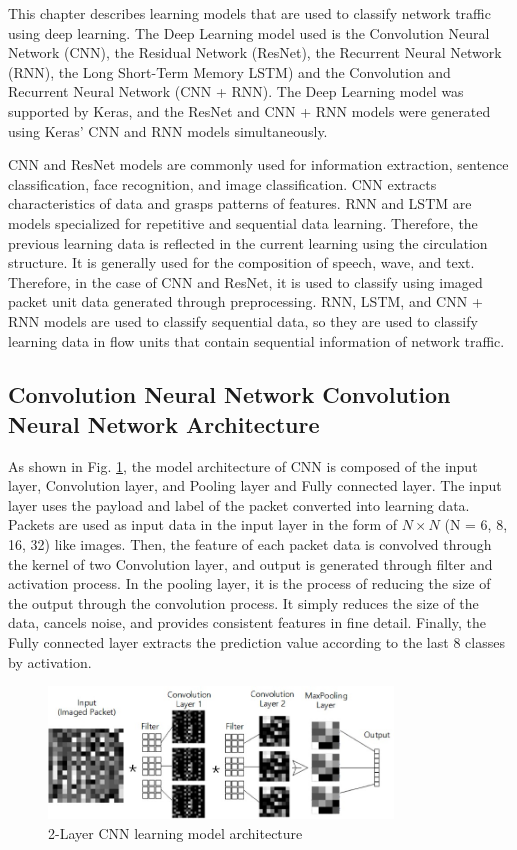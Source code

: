 This chapter describes learning models that are used to classify network traffic using deep learning.
The Deep Learning model used is the Convolution Neural Network (CNN), the Residual Network (ResNet), the Recurrent Neural Network (RNN), the Long Short-Term Memory LSTM) and the Convolution and Recurrent Neural Network (CNN + RNN).
The Deep Learning model was supported by Keras, and the ResNet and CNN + RNN models were generated using Keras' CNN and RNN models simultaneously.

CNN and ResNet models are commonly used for information extraction, sentence classification, face recognition, and image classification.
CNN extracts characteristics of data and grasps patterns of features.
RNN and LSTM are models specialized for repetitive and sequential data learning.
Therefore, the previous learning data is reflected in the current learning using the circulation structure.
It is generally used for the composition of speech, wave, and text.
Therefore, in the case of CNN and ResNet, it is used to classify using imaged packet unit data generated through preprocessing. RNN, LSTM, and CNN + RNN models are used to classify sequential data, so they are used to classify learning data in flow units that contain sequential information of network traffic.

\subsection{Convolution Neural Network Convolution Neural Network Architecture}
As shown in Fig. \ref{fig3}, the model architecture of CNN\cite{Krizhevsky:2012:ICD:2999134.2999257} is composed of the input layer, Convolution layer, and Pooling layer and Fully connected layer.
The input layer uses the payload and label of the packet converted into learning data. Packets are used as input data in the input layer in the form of $N \times N$ (N = 6, 8, 16, 32) like images.
Then, the feature of each packet data is convolved through the kernel of two Convolution layer, and output is generated through filter and activation process.
In the pooling layer, it is the process of reducing the size of the output through the convolution process.
It simply reduces the size of the data, cancels noise, and provides consistent features in fine detail.
Finally, the Fully connected layer extracts the prediction value according to the last 8 classes by activation.

\begin{figure}[t]
\centering
\setlength{\abovecaptionskip}{0pt}
\setlength{\belowcaptionskip}{0pt}
{
\includegraphics[width=3.6in]{fig3.jpg}
\caption{2-Layer CNN learning model architecture}
\label{fig3}
}
\end{figure}

